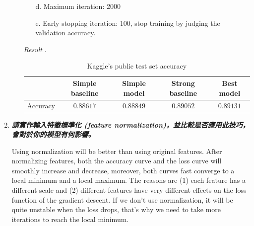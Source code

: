 \documentclass[a4paper,11pt]{article}
\begin{document}
\begin{enumerate}
\begin{enumerate}
\begin{enumerate}
				\item [d.] Maximum iteration: 2000

				\item [e.] Early stopping iteration: 100, stop training by judging the validation accuracy.
			\end{enumerate}

		\item [\textit{Result}].

		\begin{table}[htp]
			\begin{center}
				\begin{tabular}{| c | c | c | c | c | }
				  	\hline
			  		& Simple baseline & Simple model & Strong baseline & Best model\\[0.5ex] 
			  		\hline \hline
			  		Accuracy & $0.88617$ & $0.88849$ & $0.89052$ & $0.89131$\\[0.2ex]
			  		\hline
				\end{tabular}
				\caption{Kaggle's public test set accuracy}
			\end{center}
		\end{table}
	\end{enumerate}

	\item \textit{\textbf{請實作輸入特徵標準化 (feature normalization)，並比較是否應用此技巧，會對於你的模型有何影響。}}

	Using normalization will be better than using original features. After normalizing features, both the accuracy curve and the loss curve will smoothly increase and decrease, moreover, both curves fast converge to a local minimum and a local maximum. The reasons are (1) each feature has a different scale and (2) different features have very different effects on the loss function of the gradient descent. If we don't use normalization, it will be quite unstable when the loss drops, that's why we need to take more iterations to reach the local minimum.\\


\end{enumerate}
\end{document}
